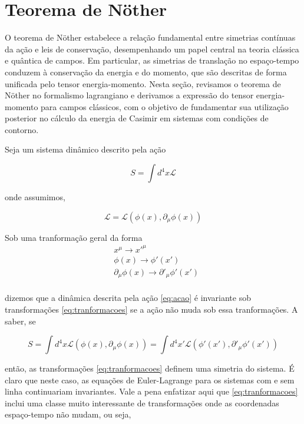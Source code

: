 \section{Teorema de Nöther}

\par O teorema de Nöther estabelece a relação fundamental entre simetrias contínuas da ação e leis de conservação, desempenhando um papel central na teoria clássica e quântica de campos. Em particular, as simetrias de translação no espaço-tempo conduzem à conservação da energia e do momento, que são descritas de forma unificada pelo tensor energia-momento. Nesta seção, revisamos o teorema de Nöther no formalismo lagrangiano e derivamos a expressão do tensor energia-momento para campos clássicos, com o objetivo de fundamentar sua utilização posterior no cálculo da energia de Casimir em sistemas com condições de contorno.

Seja um sistema dinâmico descrito pela ação

\begin{equation}
 S = \int d^4 x \mathcal{L} \label{eq:acao}
\end{equation}

onde assumimos, 

\begin{equation}
\mathcal{L} = \mathcal{L}(\phi (x), \partial_\mu \phi (x)) \label{eq:lagphi}
\end{equation}

Sob uma tranformação geral da forma
\begin{equation}
\begin{aligned}
&x^\mu \rightarrow x'^\mu \\
&\phi (x) \rightarrow \phi'(x') \\
&\partial_\mu \phi (x) \rightarrow \partial'_\mu \phi' (x') \\ \label{eq:tranformacoes}
\end{aligned}
\end{equation}

dizemos que a dinâmica descrita pela ação \eqref{eq:acao} é invariante sob transformações \eqref{eq:tranformacoes} se a ação não muda sob essa tranformações. A saber, se

\begin{equation}
S = \int d^4 x \mathcal{L} (\phi (x), \partial_\mu \phi (x)) = \int d^4 x' \mathcal{L} (\phi' (x'), \partial'_\mu \phi' (x'))
\end{equation}

então, as transformações \eqref{eq:tranformacoes} definem uma simetria do sistema. É claro que neste caso, as equações de Euler-Lagrange para os sistemas com e sem linha continuariam invariantes. Vale a pena enfatizar aqui que \ref{eq:tranformacoes} inclui uma classe muito interessante de transformações onde as coordenadas espaço-tempo não mudam, ou seja, 

